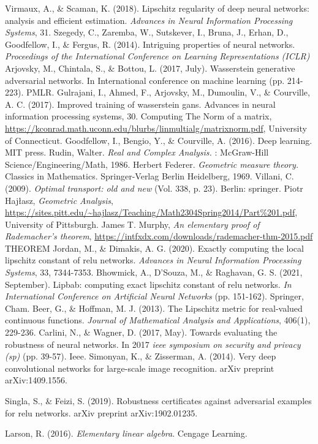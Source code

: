 \documentclass[12pt]{report}
\numberwithin{figure}{chapter}
\theoremstyle{plain}
\theoremstyle{definition}
\theoremstyle{corollary}
\theoremstyle{definition}
\theoremstyle{plain}
\theoremstyle{definition}
\theoremstyle{plain}
\begin{document}
\begin{thebibliography}{AA}
 Virmaux, A., \& Scaman, K. (2018). Lipschitz regularity of deep neural networks: analysis and efficient estimation.
\emph{Advances in Neural Information Processing Systems}, 31.
 Szegedy, C., Zaremba, W., Sutskever, I., Bruna, J., Erhan, D., Goodfellow, I., \& Fergus, R. (2014). Intriguing properties of neural networks. \emph{Proceedings of the International Conference on Learning Representations (ICLR)}
 Arjovsky, M., Chintala, S., \& Bottou, L. (2017, July). Wasserstein generative adversarial networks. In International conference on machine learning (pp. 214-223). PMLR.
 Gulrajani, I., Ahmed, F., Arjovsky, M., Dumoulin, V., \& Courville, A. C. (2017). Improved training of wasserstein gans. Advances in neural information processing systems, 30.
 Computing The Norm of a matrix, \url{https://kconrad.math.uconn.edu/blurbs/linmultialg/matrixnorm.pdf}, University of Connecticut.
Goodfellow, I., Bengio, Y., \& Courville, A. (2016). Deep learning. MIT press.
 Rudin, Walter. \emph{Real and Complex Analysis.} : McGraw-Hill Science/Engineering/Math, 1986.
 Herbert Federer. \emph{Geometric measure theory.} Classics in Mathematics. Springer-Verlag Berlin Heidelberg, 1969.
 Villani, C. (2009). \emph{Optimal transport: old and new} (Vol. 338, p. 23). Berlin: springer.
 Piotr Hajłasz, \emph{Geometric Analysis}, \url{https://sites.pitt.edu/~hajlasz/Teaching/Math2304Spring2014/Part\%201.pdf}, University of Pittsburgh.
 James T. Murphy, \emph{An elementary proof of Rademacher's theorem}, \url{https://intfxdx.com/downloads/rademacher-thm-2015.pdf}
THEOREM
 Jordan, M., \& Dimakis, A. G. (2020). Exactly computing the local lipschitz constant of relu networks. \emph{Advances in Neural Information Processing Systems}, 33, 7344-7353.
 Bhowmick, A., D’Souza, M., \& Raghavan, G. S. (2021, September). Lipbab: computing exact lipschitz constant of relu networks. \emph{In International Conference on Artificial Neural Networks} (pp. 151-162). Springer, Cham.
 Beer, G., \& Hoffman, M. J. (2013). The Lipschitz metric for real-valued continuous functions. \emph{Journal of Mathematical Analysis and Applications}, 406(1), 229-236.
 Carlini, N., \& Wagner, D. (2017, May). Towards evaluating the robustness of neural networks. In 2017 \emph{ieee symposium on security and privacy (sp)} (pp. 39-57). Ieee.
 Simonyan, K., \& Zisserman, A. (2014). Very deep convolutional networks for large-scale image recognition. arXiv preprint arXiv:1409.1556.

 Singla, S., \& Feizi, S. (2019). Robustness certificates against adversarial examples for relu networks. arXiv preprint arXiv:1902.01235.

 Larson, R. (2016). \emph{Elementary linear algebra}. Cengage Learning.
\end{thebibliography}

%
%
%
%
%
\end{document}

